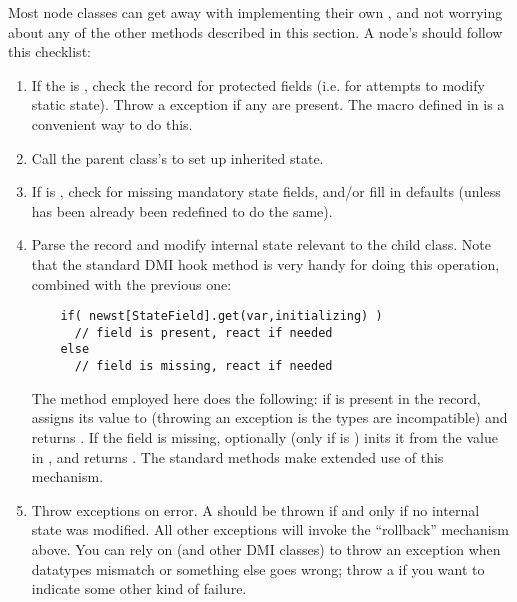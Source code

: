   Most node classes can get away with implementing their own
  , and not worrying about any of the other methods
  described in this section. A node's  should follow this
  checklist:

  \begin{enumerate}

  \item If the  is , check the record for protected
    fields (i.e. for attempts to modify static state). Throw a
     exception if any are present. The
     macro defined in  is a
    convenient way to do this.

  \item Call the parent class's  to set up inherited state.
  
  \item If
     is , check for missing mandatory state fields,
    and/or fill in defaults (unless  has been already been
    redefined to
    do the same). 
    
    

  \item Parse the record and modify internal state relevant to the child class.
    Note that the standard DMI hook method  is very handy for doing
    this operation, combined with the previous one:
    
    \begin{verbatim}
    if( newst[StateField].get(var,initializing) )
      // field is present, react if needed
    else
      // field is missing, react if needed
    \end{verbatim}
    
    The  method employed here does the following: if 
    is present in the  record, assigns its value to 
    (throwing an exception is the types are incompatible) and returns
    . If the field is missing, optionally (only if 
    is ) inits it from the value in , and returns .
    The standard  methods make extended use of this
    mechanism.

  \item Throw exceptions on error. A  should be
    thrown if and only if no internal state was modified. All other exceptions
    will invoke the ``rollback'' mechanism above. You can rely on
     (and other DMI classes) to throw an exception when
    datatypes mismatch or something else goes wrong; throw a
     if you want to indicate some other kind of
    failure.

\end{enumerate}
  


